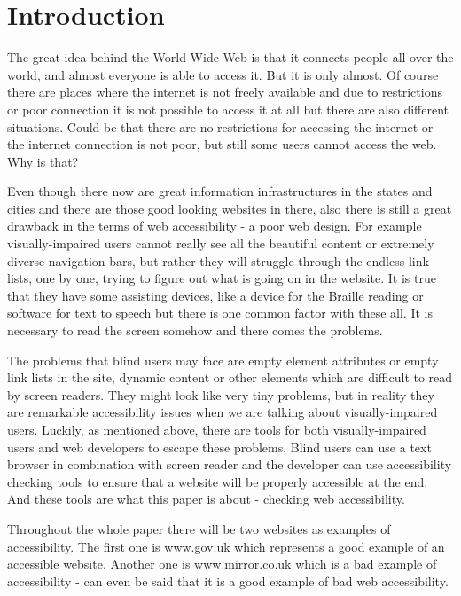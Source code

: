 %
%
% 
% 


\chapter{Introduction}

The great idea behind the World Wide Web is that it connects people
all over the world, and almost everyone is able to access it. But it
is only almost. Of course there are places where the internet is not
freely available and due to restrictions or poor connection it is not
possible to access it at all but there are also different
situations. Could be that there are no restrictions for accessing the
internet or the internet connection is not poor, but still some users
cannot access the web. Why is that?

Even though there now are great information infrastructures in the
states and cities and there are those good looking websites in there,
also there is still a great drawback in the terms of web accessibility
- a poor web design. For example visually-impaired users cannot really
see all the beautiful content or extremely diverse navigation bars,
but rather they will struggle through the endless link lists, one by
one, trying to figure out what is going on in the website. It is true
that they have some assisting devices, like a device for the Braille
reading or software for text to speech but there is one common factor
with these all. It is necessary to read the screen somehow and there
comes the problems.

The problems that blind users may face are empty element attributes or
empty link lists in the site, dynamic content or other elements which
are difficult to read by screen readers. They might look like very
tiny problems, but in reality they are remarkable accessibility issues
when we are talking about visually-impaired users. Luckily, as
mentioned above, there are tools for both visually-impaired users and
web developers to escape these problems. Blind users can use a text
browser in combination with screen reader and the developer can use
accessibility checking tools to ensure that a website will be properly
accessible at the end. And these tools are what this paper is about -
checking web accessibility.

Throughout the whole paper there will be two websites as examples of
accessibility. The first one is www.gov.uk which represents a good
example of an accessible website. Another one is www.mirror.co.uk
which is a bad example of accessibility - can even be said that it is
a good example of bad web accessibility.


